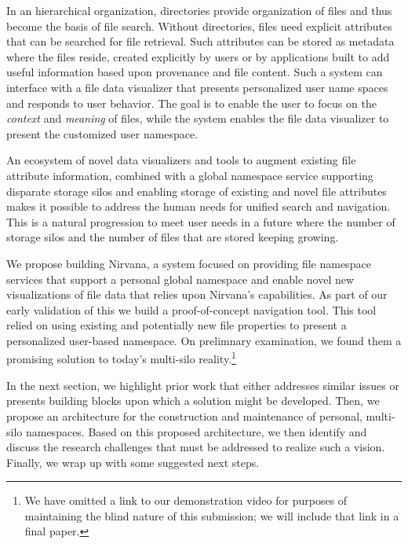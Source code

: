 In an hierarchical organization, directories provide organization of files and thus become the basis of file search.
Without directories, files need explicit attributes that can be searched for file retrieval. Such attributes
can be stored as metadata where the files reside, created explicitly by users or by applications built
to add useful information based upon provenance and file content.
Such a system can interface with a file data visualizer that presents personalized user name spaces and
responds to user behavior.  The goal is to enable the user to focus on the \textit{context} and 
\textit{meaning} of files, while the system enables the file data visualizer to present the customized
user namespace.

An ecosystem of novel data visualizers and tools to augment existing file attribute information, combined
with a global namespace service supporting disparate storage silos and enabling storage of existing and
novel file attributes makes it possible to address the human needs for unified search and navigation.
This is a natural progression to meet user needs in a future where the number of storage silos and 
the number of files that are stored keeping growing. 

We propose building Nirvana, a system focused on providing file namespace services that support a personal global namespace and enable
novel new visualizations of file data that relies upon Nirvana's capabilities.
As part of our early validation of this we build a proof-of-concept navigation tool.
This tool relied on using existing and potentially new file properties to present a personalized user-based namespace.
On prelimnary examination, we found them a promising solution to today's multi-silo reality.\footnote{We have omitted a link to our demonstration video for purposes of maintaining the blind nature of this submission; we will include that link in a final paper.} 

    
In the next section, we highlight prior work that either addresses similar issues or presents building blocks upon which a solution might be developed. Then, we propose an architecture for the construction and maintenance of personal, multi-silo namespaces. Based on this proposed architecture, we then identify and discuss the research challenges that must be addressed to realize such a vision. Finally, we wrap up with some suggested next steps.













